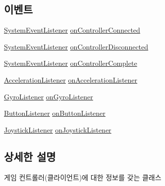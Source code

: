 \subsection*{이벤트}
\begin{DoxyCompactItemize}
\item 
\hyperlink{class_game_controller_a6c79406c908b41c4f4520c6789d829e6}{System\+Event\+Listener} \hyperlink{class_game_controller_a32dbe49ae40c100cac70423e2ac81aa7}{on\+Controller\+Connected}
\item 
\hyperlink{class_game_controller_a6c79406c908b41c4f4520c6789d829e6}{System\+Event\+Listener} \hyperlink{class_game_controller_aca9c2b01d155e895c249ac05e1eb9bf4}{on\+Controller\+Disconnected}
\item 
\hyperlink{class_game_controller_a6c79406c908b41c4f4520c6789d829e6}{System\+Event\+Listener} \hyperlink{class_game_controller_a1bd8fb1c7e90146c8bbc25615ffcd4e5}{on\+Controller\+Complete}
\item 
\hyperlink{class_game_controller_a87b7db4c19ae1dd2ecbf94c6f1be5c90}{Acceleration\+Listener} \hyperlink{class_game_controller_a2c93984c2eab77efd735468a234d4a77}{on\+Acceleration\+Listener}
\item 
\hyperlink{class_game_controller_a5e0106b2e58b70c011fe7f7e9f58ecce}{Gyro\+Listener} \hyperlink{class_game_controller_ae051ab28fdc0f6bf06d1c5fbb4ad3f21}{on\+Gyro\+Listener}
\item 
\hyperlink{class_game_controller_a0d4534f57395c87d869dc90a70419e7f}{Button\+Listener} \hyperlink{class_game_controller_a8573dccb810a91d3e1b571f72e321849}{on\+Button\+Listener}
\item 
\hyperlink{class_game_controller_a653ceafbd20d279abc65adf386a358aa}{Joystick\+Listener} \hyperlink{class_game_controller_a4ac337d799821aba5064e4e91c565eb9}{on\+Joystick\+Listener}
\end{DoxyCompactItemize}


\subsection{상세한 설명}
게임 컨트롤러(클라이언트)에 대한 정보를 갖는 클래스

